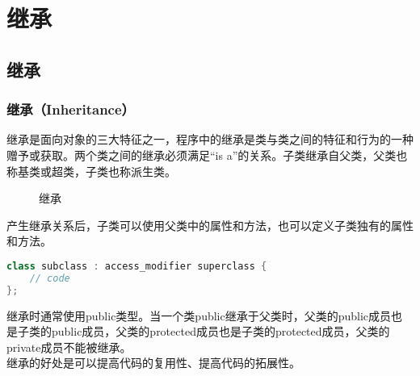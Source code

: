\chapter{继承}

\section{继承}

\subsection{继承（Inheritance）}

继承是面向对象的三大特征之一，程序中的继承是类与类之间的特征和行为的一种赠予或获取。两个类之间的继承必须满足“is a”的关系。子类继承自父类，父类也称基类或超类，子类也称派生类。

\begin{figure}[H]
	\centering
	\caption{继承}
\end{figure}

产生继承关系后，子类可以使用父类中的属性和方法，也可以定义子类独有的属性和方法。

\vspace{-0.5cm}

\begin{lstlisting}[language=Java]
class subclass : access_modifier superclass {
    // code
};
\end{lstlisting}

继承时通常使用public类型。当一个类public继承于父类时，父类的public成员也是子类的public成员，父类的protected成员也是子类的protected成员，父类的private成员不能被继承。\\

继承的好处是可以提高代码的复用性、提高代码的拓展性。\\

